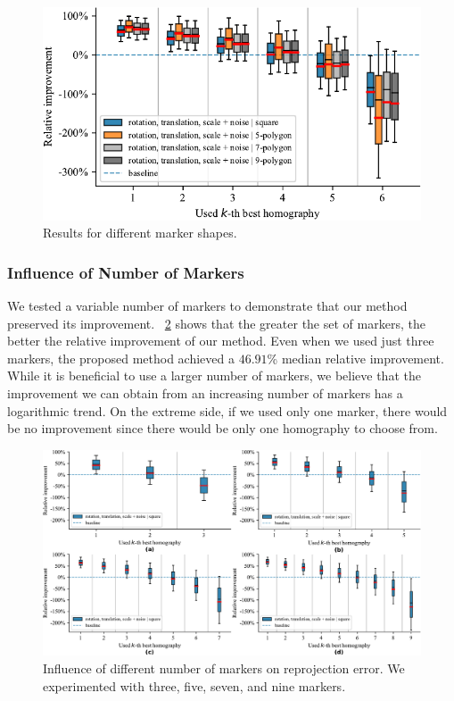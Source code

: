 \begin{figure}[t]
    \centering
    \includegraphics[width=\boxplotimgwidth]{figures/homography/shape_influence.pdf}
    \caption[Influence of marker shape]{Results for different marker shapes.}
    \label{fig:ShapeInfluence}
\end{figure}

\subsubsection{Influence of Number of Markers}

We tested a variable number of markers to demonstrate that our method preserved its improvement. \figtext{}~\ref{fig:NMarkersInfluence} shows that the greater the set of markers, the better the relative improvement of our method. Even when we used just three markers, the proposed method achieved a $46.91$\% median relative improvement.
While it is beneficial to use a larger number of markers, we believe that the improvement we can obtain from an increasing number of markers has a logarithmic trend. On the extreme side, if we used only one marker, there would be no improvement since there would be only one homography to choose from.

\begin{figure}[t]
    \centering
    \includegraphics[width=\linewidth]{figures/homography/n_markers_influence.pdf}
    \caption[Influence of number of markers]{Influence of different number of markers on reprojection error. We experimented with  three,  five,  seven, and  nine markers.}
    \label{fig:NMarkersInfluence}
\end{figure}

